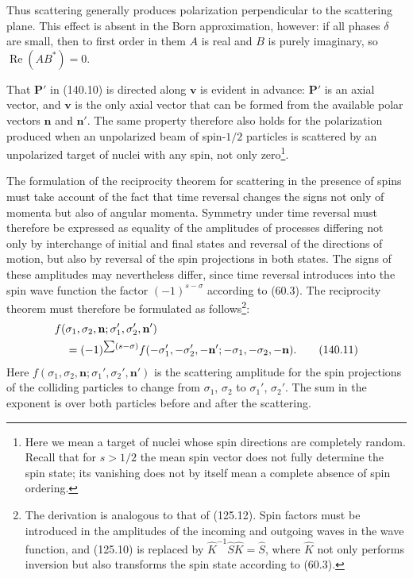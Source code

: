 Thus scattering generally produces polarization perpendicular to the
scattering plane. This effect is absent in the Born approximation, however:
if all phases $\delta$ are small, then to first order in them $A$ is real and
$B$ is purely imaginary, so $\operatorname{Re}(AB^*)=0$.

That $\mathbf P'$ in (140.10) is directed along $\mathbf v$ is evident in
advance: $\mathbf P'$ is an axial vector, and $\mathbf v$ is the only axial
vector that can be formed from the available polar vectors $\mathbf n$ and
$\mathbf n'$. The same property therefore also holds for the polarization
produced when an unpolarized beam of spin-$1/2$ particles is scattered by an
unpolarized target of nuclei with any spin, not only zero\footnote{Here we
mean a target of nuclei whose spin directions are completely random. Recall
that for $s>1/2$ the mean spin vector does not fully determine the spin state;
its vanishing does not by itself mean a complete absence of spin ordering.}.

The formulation of the reciprocity theorem for scattering in the presence of
spins must take account of the fact that time reversal changes the signs not
only of momenta but also of angular momenta. Symmetry under time reversal must
therefore be expressed as equality of the amplitudes of processes differing
not only by interchange of initial and final states and reversal of the
directions of motion, but also by reversal of the spin projections in both
states. The signs of these amplitudes may nevertheless differ, since time
reversal introduces into the spin wave function the factor
$(-1)^{s-\sigma}$ according to (60.3). The reciprocity theorem must therefore
be formulated as follows\footnote{The derivation is analogous to that of
(125.12). Spin factors must be introduced in the amplitudes of the incoming
and outgoing waves in the wave function, and (125.10) is replaced by
$\hat K^{-1}\hat S\hat K=\hat S$, where $\hat K$ not only performs inversion
but also transforms the spin state according to (60.3).}:
\begin{align}
 &f(\sigma_1,\sigma_2,\mathbf n;\sigma_1',\sigma_2',\mathbf n')\notag\\
 &\quad=(-1)^{\sum(s-\sigma)}
 f(-\sigma_1',-\sigma_2',-\mathbf n';-\sigma_1,-\sigma_2,-\mathbf n).
 \tag{140.11}
\end{align}
Here $f(\sigma_1,\sigma_2,\mathbf n;\sigma_1',\sigma_2',\mathbf n')$ is the
scattering amplitude for the spin projections of the colliding particles to
change from $\sigma_1$, $\sigma_2$ to $\sigma_1'$, $\sigma_2'$. The sum in
the exponent is over both particles before and after the scattering.

